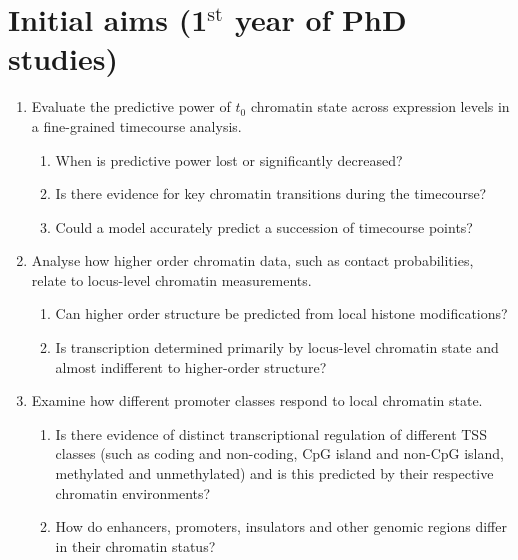 \documentclass[a4paper]{report}
\begin{document}
\section*{Initial aims (1$^{\text{st}}$ year of PhD studies)}
\begin{enumerate}
\item Evaluate the predictive power of $t_0$ chromatin state across
  expression levels in a fine-grained timecourse analysis. 
\begin{enumerate}
\item When is predictive power lost or significantly decreased?
\item Is there evidence for key chromatin transitions during the
  timecourse?
\item Could a model accurately predict a succession of timecourse
  points?
\end{enumerate}
\item Analyse how higher order chromatin data, such as contact
  probabilities, relate to locus-level chromatin measurements.
\begin{enumerate}
\item Can higher order structure be predicted from local histone
  modifications?
\item Is transcription determined primarily by locus-level chromatin
  state and almost indifferent to higher-order structure?
\end{enumerate}
\item Examine how different promoter classes respond to local
  chromatin state.
\begin{enumerate}
\item Is there evidence of distinct transcriptional regulation of
  different TSS classes (such as coding and non-coding, CpG island and
  non-CpG island, methylated and unmethylated) and is this predicted by their respective
  chromatin environments?
\item How do enhancers, promoters, insulators and other genomic
  regions differ in their chromatin status?
\end{enumerate}
\end{enumerate}
\end{document}
